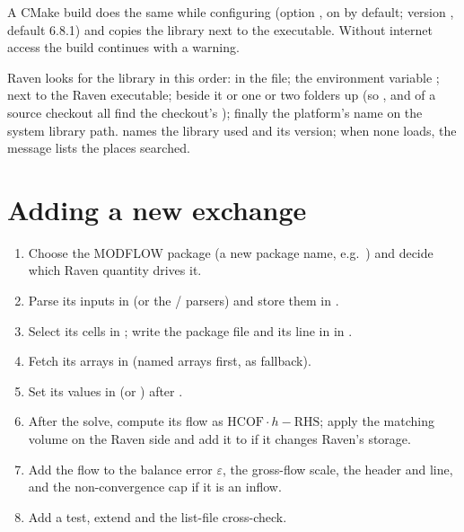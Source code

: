 A CMake build does the same while configuring (option , on by default; version
, default 6.8.1) and copies the library next to the executable. Without internet access
the build continues with a warning.

Raven looks for the library in this order:  in the  file; the environment variable
; next to the Raven executable;  beside it or one or two folders up (so
,  and  of a source checkout all find the checkout's
); finally the platform's name on the system library path.  names the library used
and its version; when none loads, the message lists the places searched.

\section{Adding a new exchange}
\begin{enumerate}
\item Choose the MODFLOW package (a new package name, e.g.\ ) and decide which Raven quantity drives it.
\item Parse its inputs in  (or the / parsers) and store them in .
\item Select its cells in ; write the package file and its line in  in .
\item Fetch its arrays in  (named arrays first,  as fallback).
\item Set its values in  (or ) after .
\item After the solve, compute its flow as $\mathrm{HCOF}\cdot h-\mathrm{RHS}$; apply the matching volume on the Raven side
and add it to  if it changes Raven's storage.
\item Add the flow to the balance error $\varepsilon$, the gross-flow scale, the  header and line, and the
non-convergence cap if it is an inflow.
\item Add a test, extend  and the list-file cross-check.
\end{enumerate}
